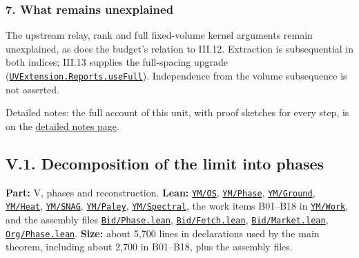 \documentclass[
  letterpaper,
  11pt]{article}
\begin{document}
\subsubsection{7. What remains
unexplained}\label{what-remains-unexplained-19}

The upstream relay, rank and full fixed-volume kernel arguments remain
unexplained, as does the budget's relation to III.12. Extraction is
subsequential in both indices; III.13 supplies the full-spacing upgrade
(\href{https://github.com/yang-mills-group/OpenAI-YM-20261028/blob/3456e5e75cf8d4cd558955a5c7638fba2d68f464/YM/UVExtension/Reports/Ultraviolet.lean\#L62-L69}{\texttt{UVExtension.Reports.useFull}}).
Independence from the volume subsequence is not asserted.

Detailed notes: the full account of this unit, with proof sketches for
every step, is on the
\href{https://github.com/scottnarmstrong/yang-mills-informalization/blob/main/outline/notes/IV-1.md}{detailed
notes page}.

\subsection{V.1. Decomposition of the limit into
phases}\label{v.1.-decomposition-of-the-limit-into-phases}

\textbf{Part:} V, phases and reconstruction. \textbf{Lean:}
\href{https://github.com/yang-mills-group/OpenAI-YM-20261028/tree/3456e5e75cf8d4cd558955a5c7638fba2d68f464/YM/OS}{\texttt{YM/OS}},
\href{https://github.com/yang-mills-group/OpenAI-YM-20261028/tree/3456e5e75cf8d4cd558955a5c7638fba2d68f464/YM/Phase}{\texttt{YM/Phase}},
\href{https://github.com/yang-mills-group/OpenAI-YM-20261028/tree/3456e5e75cf8d4cd558955a5c7638fba2d68f464/YM/Ground}{\texttt{YM/Ground}},
\href{https://github.com/yang-mills-group/OpenAI-YM-20261028/tree/3456e5e75cf8d4cd558955a5c7638fba2d68f464/YM/Heat}{\texttt{YM/Heat}},
\href{https://github.com/yang-mills-group/OpenAI-YM-20261028/tree/3456e5e75cf8d4cd558955a5c7638fba2d68f464/YM/SNAG}{\texttt{YM/SNAG}},
\href{https://github.com/yang-mills-group/OpenAI-YM-20261028/tree/3456e5e75cf8d4cd558955a5c7638fba2d68f464/YM/Paley}{\texttt{YM/Paley}},
\href{https://github.com/yang-mills-group/OpenAI-YM-20261028/tree/3456e5e75cf8d4cd558955a5c7638fba2d68f464/YM/Spectral}{\texttt{YM/Spectral}},
the work items B01--B18 in
\href{https://github.com/yang-mills-group/OpenAI-YM-20261028/tree/3456e5e75cf8d4cd558955a5c7638fba2d68f464/YM/Work}{\texttt{YM/Work}},
and the assembly files
\href{https://github.com/yang-mills-group/OpenAI-YM-20261028/blob/3456e5e75cf8d4cd558955a5c7638fba2d68f464/YM/Bid/Phase.lean}{\texttt{Bid/Phase.lean}},
\href{https://github.com/yang-mills-group/OpenAI-YM-20261028/blob/3456e5e75cf8d4cd558955a5c7638fba2d68f464/YM/Bid/Fetch.lean}{\texttt{Bid/Fetch.lean}},
\href{https://github.com/yang-mills-group/OpenAI-YM-20261028/blob/3456e5e75cf8d4cd558955a5c7638fba2d68f464/YM/Bid/Market.lean}{\texttt{Bid/Market.lean}},
\href{https://github.com/yang-mills-group/OpenAI-YM-20261028/blob/3456e5e75cf8d4cd558955a5c7638fba2d68f464/YM/Org/Phase.lean}{\texttt{Org/Phase.lean}}.
\textbf{Size:} about 5,700 lines in declarations used by the main
theorem, including about 2,700 in B01--B18, plus the assembly files.
\end{document}
